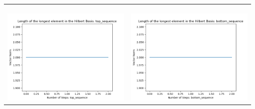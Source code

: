 \documentclass[10pt]{article}
\begin{document}
\begin{tabular}{c|c}
\begin{minipage}{.45\textwidth}
\end{minipage} \\ \\
\hline \\\begin{minipage}{.45\textwidth}
\includegraphics[width=\textwidth]{"DATA/5d/5 generators 1 bound E/top_sequence LENGTH"}
\end{minipage} &
\begin{minipage}{.45\textwidth}
\includegraphics[width=\textwidth]{"DATA/5d/5 generators 1 bound E bottomup/bottom_sequence LENGTH"}
\end{minipage}
\end{tabular}
\end{document}
